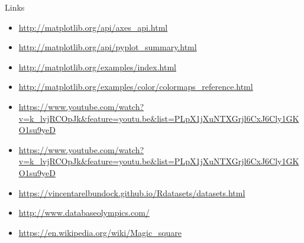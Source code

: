 \documentclass{beamer}
\begin{document}
\begin{frame}
\begin{center}
\huge{Links}
\end{center}
\scriptsize{
\begin{itemize}
\item \url{http://matplotlib.org/api/axes_api.html}
\item \url{http://matplotlib.org/api/pyplot_summary.html}
\item \url{http://matplotlib.org/examples/index.html}
\item \url{http://matplotlib.org/examples/color/colormaps_reference.html}
\item \url{https://www.youtube.com/watch?v=k_lvjRCOpJk&feature=youtu.be&list=PLpX1jXuNTXGrjl6CxJ6Cly1GKO1su9yeD}
\item \url{https://www.youtube.com/watch?v=k_lvjRCOpJk&feature=youtu.be&list=PLpX1jXuNTXGrjl6CxJ6Cly1GKO1su9yeD}
\item \url{https://vincentarelbundock.github.io/Rdatasets/datasets.html}
\item \url{http://www.databaseolympics.com/}
\item \url{https://en.wikipedia.org/wiki/Magic_square}
\end{itemize}
}
\end{frame}
\end{document}

